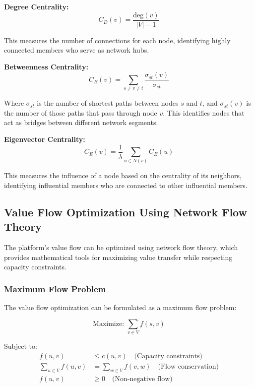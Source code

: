\textbf{Degree Centrality:}
\begin{equation}
C_D(v) = \frac{\text{deg}(v)}{|V| - 1}
\end{equation}

This measures the number of connections for each node, identifying highly connected members who serve as network hubs.

\textbf{Betweenness Centrality:}
\begin{equation}
C_B(v) = \sum_{s \neq v \neq t} \frac{\sigma_{st}(v)}{\sigma_{st}}
\end{equation}

Where $\sigma_{st}$ is the number of shortest paths between nodes $s$ and $t$, and $\sigma_{st}(v)$ is the number of those paths that pass through node $v$. This identifies nodes that act as bridges between different network segments.

\textbf{Eigenvector Centrality:}
\begin{equation}
C_E(v) = \frac{1}{\lambda} \sum_{u \in N(v)} C_E(u)
\end{equation}

This measures the influence of a node based on the centrality of its neighbors, identifying influential members who are connected to other influential members.

\subsection{Value Flow Optimization Using Network Flow Theory}

The platform's value flow can be optimized using network flow theory, which provides mathematical tools for maximizing value transfer while respecting capacity constraints.

\subsubsection{Maximum Flow Problem}

The value flow optimization can be formulated as a maximum flow problem:

\begin{equation}
\text{Maximize: } \sum_{v \in V} f(s, v)
\end{equation}

Subject to:
\begin{align}
f(u, v) &\leq c(u, v) \quad \text{(Capacity constraints)} \\
\sum_{u \in V} f(u, v) &= \sum_{w \in V} f(v, w) \quad \text{(Flow conservation)} \\
f(u, v) &\geq 0 \quad \text{(Non-negative flow)}
\end{align}

